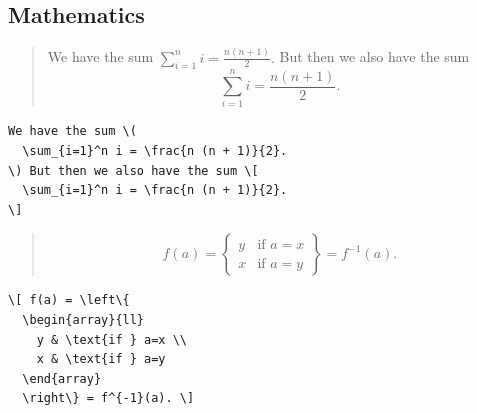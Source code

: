 \begin{frame}
  \begin{example}
    
  \end{example}
\end{frame}


\subsection{Mathematics}

\begin{frame}[fragile]
  \begin{example}[Output]
    \begin{quote}
We have the sum \(
  \sum_{i=1}^n i = \frac{n (n + 1)}{2}.
\) But then we also have the sum \[
  \sum_{i=1}^n i = \frac{n (n + 1)}{2}.
\]
    \end{quote}
  \end{example}

  \pause

  \begin{example}[Input]
    \begin{lstlisting}
We have the sum \(
  \sum_{i=1}^n i = \frac{n (n + 1)}{2}.
\) But then we also have the sum \[
  \sum_{i=1}^n i = \frac{n (n + 1)}{2}.
\]
    \end{lstlisting}
  \end{example}
\end{frame}

\begin{frame}[fragile]
  \begin{example}[Output]
    \begin{quote}
      \[ f(a) = \left\{
          \begin{array}{ll}
            y & \text{if } a=x \\
            x & \text{if } a=y
          \end{array}
      \right\} = f^{-1}(a). \]
    \end{quote}
  \end{example}

  \pause

  \begin{example}[Input]
    \begin{lstlisting}
\[ f(a) = \left\{
  \begin{array}{ll}
    y & \text{if } a=x \\
    x & \text{if } a=y
  \end{array}
  \right\} = f^{-1}(a). \]
    \end{lstlisting}
  \end{example}
\end{frame}

